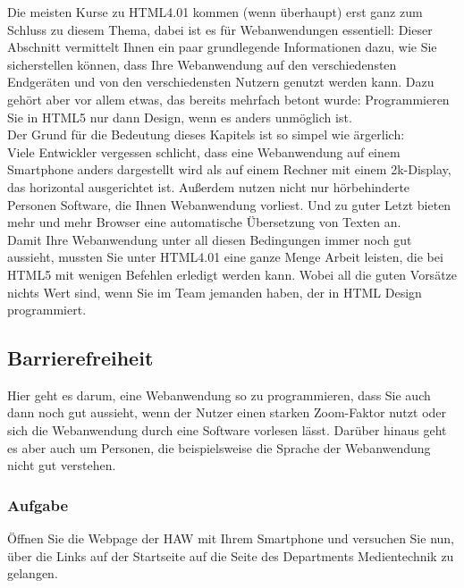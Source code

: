 Die meisten Kurse zu HTML4.01 kommen (wenn überhaupt) erst ganz zum Schluss zu diesem Thema, dabei ist es für Webanwendungen essentiell: Dieser Abschnitt vermittelt Ihnen ein paar grundlegende Informationen dazu, wie Sie sicherstellen können, dass Ihre Webanwendung auf den verschiedensten Endgeräten und von den verschiedensten Nutzern genutzt werden kann. Dazu gehört aber vor allem etwas, das bereits mehrfach betont wurde: Programmieren Sie in HTML5 nur dann Design, wenn es anders unmöglich ist.\\

Der Grund für die Bedeutung dieses Kapitels ist so simpel wie ärgerlich:\\

Viele Entwickler vergessen schlicht, dass eine Webanwendung auf einem Smartphone anders dargestellt wird als auf einem Rechner mit einem 2k-Display, das horizontal ausgerichtet ist. Außerdem nutzen nicht nur hörbehinderte Personen Software, die Ihnen Webanwendung vorliest. Und zu guter Letzt bieten mehr und mehr Browser eine automatische Übersetzung von Texten an.\\

Damit Ihre Webanwendung unter all diesen Bedingungen immer noch gut aussieht, mussten Sie unter HTML4.01 eine ganze Menge Arbeit leisten, die bei HTML5 mit wenigen Befehlen erledigt werden kann. Wobei all die guten Vorsätze nichts Wert sind, wenn Sie im Team jemanden haben, der in HTML Design programmiert.

\subsection{Barrierefreiheit}

Hier geht es darum, eine Webanwendung so zu programmieren, dass Sie auch dann noch gut aussieht, wenn der Nutzer einen starken Zoom-Faktor nutzt oder sich die Webanwendung durch eine Software vorlesen lässt. Darüber hinaus geht es aber auch um Personen, die beispielsweise die Sprache der Webanwendung nicht gut verstehen.

\subsubsection{Aufgabe}

Öffnen Sie die Webpage der HAW mit Ihrem Smartphone und versuchen Sie nun, über die Links auf der Startseite auf die Seite des Departments Medientechnik zu gelangen.\\

